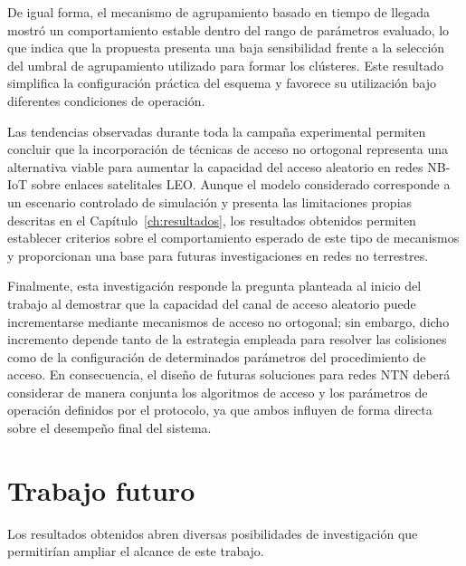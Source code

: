 De igual forma, el mecanismo de agrupamiento basado en tiempo de llegada mostró un comportamiento estable dentro del rango de parámetros evaluado, lo que indica que la propuesta presenta una baja sensibilidad frente a la selección del umbral de agrupamiento utilizado para formar los clústeres. Este resultado simplifica la configuración práctica del esquema y favorece su utilización bajo diferentes condiciones de operación.

Las tendencias observadas durante toda la campaña experimental permiten concluir que la incorporación de técnicas de acceso no ortogonal representa una alternativa viable para aumentar la capacidad del acceso aleatorio en redes NB-IoT sobre enlaces satelitales LEO. Aunque el modelo considerado corresponde a un escenario controlado de simulación y presenta las limitaciones propias descritas en el Capítulo~\ref{ch:resultados}, los resultados obtenidos permiten establecer criterios sobre el comportamiento esperado de este tipo de mecanismos y proporcionan una base para futuras investigaciones en redes no terrestres.

Finalmente, esta investigación responde la pregunta planteada al inicio del trabajo al demostrar que la capacidad del canal de acceso aleatorio puede incrementarse mediante mecanismos de acceso no ortogonal; sin embargo, dicho incremento depende tanto de la estrategia empleada para resolver las colisiones como de la configuración de determinados parámetros del procedimiento de acceso. En consecuencia, el diseño de futuras soluciones para redes NTN deberá considerar de manera conjunta los algoritmos de acceso y los parámetros de operación definidos por el protocolo, ya que ambos influyen de forma directa sobre el desempeño final del sistema.

\section{Trabajo futuro}

Los resultados obtenidos abren diversas posibilidades de investigación que permitirían ampliar el alcance de este trabajo.

